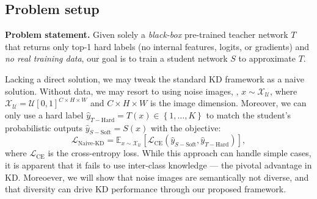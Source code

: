 \subsection{Problem setup} \label{ssec:03-framework-setup}
\begin{foldable} %
    \textbf{Problem statement.}
    Given solely a \textit{black-box} pre-trained teacher network $T$ that returns only top-1 hard labels (no internal features, logits, or gradients) and \textit{no real training data}, our goal is to train a student network $S$ to approximate $T$.
\end{foldable}

\begin{foldable} %
    Lacking a direct solution, we may tweak the standard KD framework \citep{hinton2015distilling} as a naive solution.
    Without data, we may resort to using noise images, \eg, $x\sim\mathcal{X}_{\mathcal{U}}$, where $\mathcal{X}_{\mathcal{U}}=\mathcal{U}\left[0,1\right]^{C\times H\times W}$ and $C\times H\times W$ is the image dimension.
    Moreover, we can only use a hard label $\hat{y}_{T-\text{Hard}}=T(x)\in\left\{ 1,\ldots,K\right\}$ to match the student's probabilistic outputs $\hat{y}_{S-\text{Soft}}=S\left(x\right)$ with the objective:
    \begin{equation} \label{eq:loss-naive-kd}
        \mathcal{L}_{\text{Naive-KD}}=\mathbb{E}_{x\sim\mathcal{X}_{\mathcal{U}}}\left[\mathcal{L}_{\text{CE}}\left(\hat{y}_{S-\text{Soft}},\hat{y}_{T-\text{Hard}}\right)\right],
    \end{equation}
    where $\mathcal{L}_{\text{CE}}$ is the cross-entropy loss.
    While this approach can handle simple cases, it is apparent that it fails to use inter-class knowledge --- the pivotal advantage in KD.
    Moreoever, we will show that noise images are semantically not diverse, and that diversity can drive KD performance through our proposed framework.
\end{foldable}

